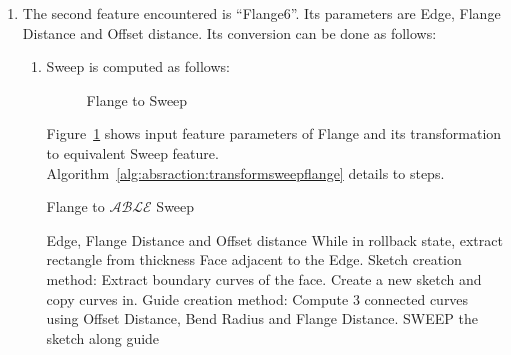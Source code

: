 \begin{enumerate}
\item The second feature encountered is ``Flange6''.  Its parameters are Edge, Flange Distance and Offset distance. Its conversion can be done as follows:
	\begin{enumerate}
	[noitemsep,topsep=2pt,parsep=2pt,partopsep=2pt]
	\item	Sweep    is computed as follows:	
		
	
	


\begin{figure}[!h]
\centering 
{}\quad
{}
\caption{Flange to Sweep}
\label{fig_fl6sw1}
\end{figure}



Figure~\ref{fig_fl6sw1} shows input feature parameters of Flange and its transformation to equivalent Sweep feature. Algorithm~\ref{alg:absraction:transformsweepflange} details to steps.
		
\bigskip
		  \begin{minipage}{\linewidth}
		  \begin{algorithm}[H]
			\caption{Flange to $\mathcal{ABLE}$ Sweep}
			\label{alg:absraction:transformsweepflange}
			\begin{algorithmic}[1]
					\REQUIRE Edge,  Flange Distance and Offset distance
					\STATE  While in rollback state, extract rectangle from thickness Face adjacent to the Edge.
					\STATE  Sketch creation method:  Extract boundary curves of the face. Create a new sketch and copy curves in.		
					\STATE Guide creation method: Compute 3 connected curves using Offset Distance, Bend Radius and Flange Distance.	
					\STATE  SWEEP the sketch along guide
				\end{algorithmic}
		\end{algorithm}	
		  \end{minipage}				
\bigskip	
	     

\end{enumerate}
\end{enumerate}
